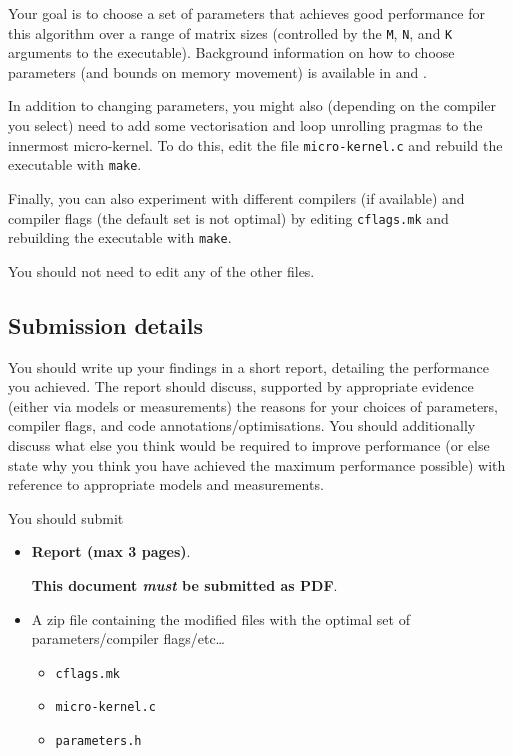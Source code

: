 \documentclass[a4paper]{article}
\begin{document}
Your goal is to choose a set of parameters that achieves good
performance for this algorithm over a range of matrix sizes
(controlled by the \texttt{M}, \texttt{N}, and \texttt{K} arguments to
the executable). Background information on how to choose
parameters (and bounds on memory movement) is available in
\textcite{Low:2016} and \textcite{Smith:2017}.

In addition to changing parameters, you might also (depending on the
compiler you select) need to add some vectorisation and loop unrolling
pragmas to the innermost micro-kernel. To do this, edit the file
\texttt{micro-kernel.c} and rebuild the executable with \texttt{make}.

Finally, you can also experiment with different compilers (if
available) and compiler flags (the default set is not optimal) by
editing \texttt{cflags.mk} and rebuilding the executable with
\texttt{make}.

You should not need to edit any of the other files.

\pagebreak
\subsection{Submission details}
\label{sec:submission}

You should write up your findings in a short report, detailing the
performance you achieved. The report should discuss, supported by
appropriate evidence (either via models or measurements) the reasons
for your choices of parameters, compiler flags, and code
annotations/optimisations. You should additionally discuss what else
you think would be required to improve performance (or else state why
you think you have achieved the maximum performance possible) with
reference to appropriate models and measurements.

You should submit

\begin{itemize}
\item \textbf{Report (max 3 pages)}.

  \textbf{This document \emph{must} be submitted as PDF}.

  
\item A zip file containing the modified files with the optimal set of
  parameters/compiler flags/etc\dots
  \begin{itemize}
  \item \texttt{cflags.mk}
  \item \texttt{micro-kernel.c}
  \item \texttt{parameters.h}
  \end{itemize}
\end{itemize}
\end{document}
